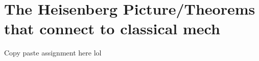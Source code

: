\chapter{The Heisenberg Picture/Theorems that connect to classical mech}
Copy paste assignment here lol